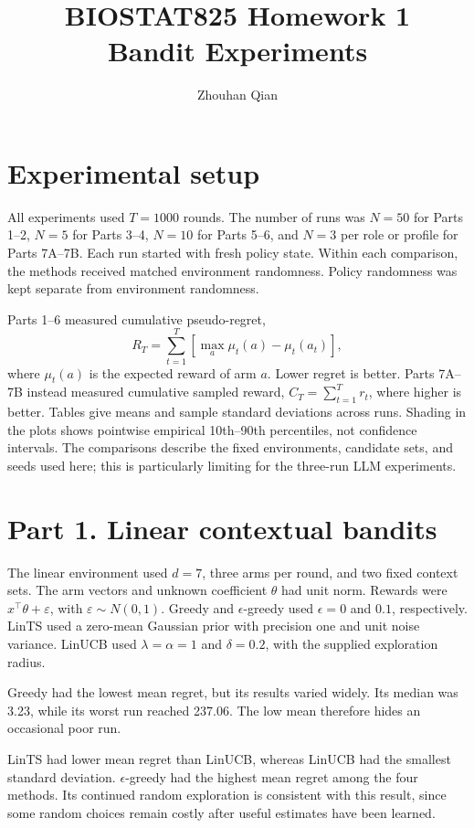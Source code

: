 \documentclass[11pt,letterpaper]{article}
\title{BIOSTAT825 Homework 1\\Bandit Experiments}
\author{Zhouhan Qian}
\date{}
\begin{document}
\maketitle
\vspace{-2em}

\section*{Experimental setup}
All experiments used $T=1000$ rounds. The number of runs was $N=50$ for Parts 1--2,
$N=5$ for Parts 3--4, $N=10$ for Parts 5--6, and $N=3$ per role or profile for Parts 7A--7B.
Each run started with fresh policy state. Within each comparison, the methods received
matched environment randomness. Policy randomness was kept separate from environment randomness.

Parts 1--6 measured cumulative pseudo-regret,
\[
 R_T=\sum_{t=1}^{T}\left[\max_a\mu_t(a)-\mu_t(a_t)\right],
\]
where $\mu_t(a)$ is the expected reward of arm $a$. Lower regret is better.
Parts 7A--7B instead measured cumulative sampled reward, $C_T=\sum_{t=1}^{T}r_t$, where higher is better.
Tables give means and sample standard deviations across runs. Shading in the plots
shows pointwise empirical 10th--90th percentiles, not confidence intervals.
The comparisons describe the fixed environments, candidate sets, and seeds used here;
this is particularly limiting for the three-run LLM experiments.

\section*{Part 1. Linear contextual bandits}
The linear environment used $d=7$, three arms per round, and two fixed context sets.
The arm vectors and unknown coefficient $\theta$ had unit norm. Rewards were
$x^\top\theta+\varepsilon$, with $\varepsilon\sim N(0,1)$.
Greedy and $\epsilon$-greedy used $\epsilon=0$ and $0.1$, respectively.
LinTS used a zero-mean Gaussian prior with precision one and unit noise variance.
LinUCB used $\lambda=\alpha=1$ and $\delta=0.2$, with the supplied exploration radius.

Greedy had the lowest mean regret, but its results varied widely. Its median was 3.23, while its worst run reached 237.06. The low mean therefore hides an occasional poor run.

LinTS had lower mean regret than LinUCB, whereas LinUCB had the smallest standard deviation. $\epsilon$-greedy had the highest mean regret among the four methods. Its continued random exploration is consistent with this result, since some random choices remain costly after useful estimates have been learned.
\end{document}

